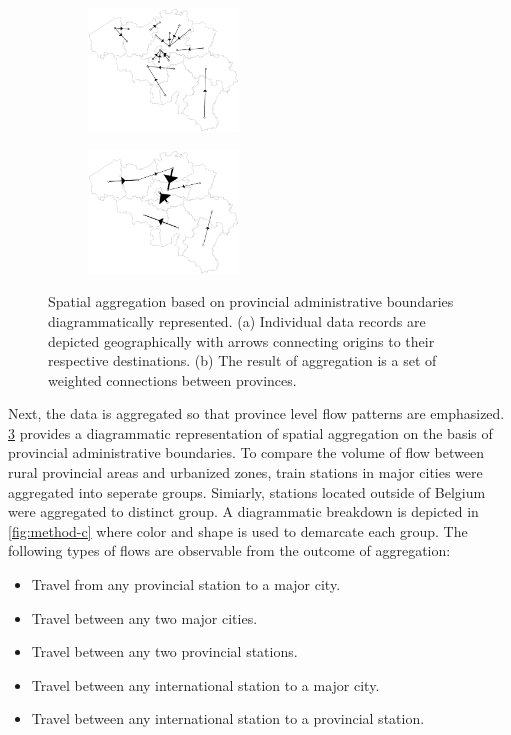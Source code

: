 \documentclass{sig-alternate}
\begin{document}
\begin{figure}[h]
  \centering
  \begin{subfigure}{.2375\textwidth}
    \includegraphics[width=4cm]{method-a.pdf}\\
    \subcaption{} %
    \label{fig:method-a}
  \end{subfigure}%
  \begin{subfigure}{.2375\textwidth}
    \includegraphics[width=4cm]{method-b.pdf}\\
    \subcaption{} %
    \label{fig:method-b}
  \end{subfigure}%
  \vspace{5.0pt}%
  \label{fig:method}
  \caption{Spatial aggregation based on provincial administrative boundaries diagrammatically represented. (a) Individual data records are depicted geographically with arrows connecting origins to their respective destinations. (b) The result of aggregation is a set of weighted connections between provinces.}
\end{figure}

Next, the data is aggregated so that province level flow patterns are emphasized.
\cref{fig:method} provides a diagrammatic representation of spatial aggregation on the basis of provincial administrative boundaries.
To compare the volume of flow between rural provincial areas and urbanized zones, train stations in major cities were aggregated into seperate groups. 
Simiarly, stations located outside of Belgium were aggregated to distinct group. 
A diagrammatic breakdown is depicted in \cref{fig:method-c} where color and shape is used to demarcate each group.
The following types of flows are observable from the outcome of aggregation:

\begin{itemize}
  \item Travel from any provincial station to a major city.
  \item Travel between any two major cities.
  \item Travel between any two provincial stations.
  \item Travel between any international station to a major city.
  \item Travel between any international station to a provincial station.
\end{itemize}
\end{document}
